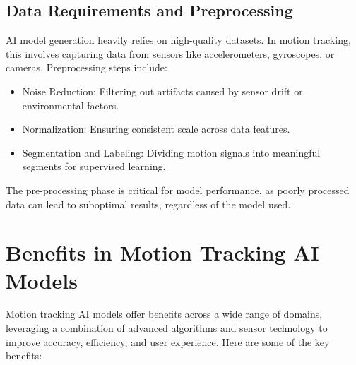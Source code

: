 \subsection{Data Requirements and Preprocessing}

AI model generation heavily relies on high-quality datasets. In motion tracking, this involves capturing data from sensors like accelerometers, gyroscopes, or cameras. Preprocessing steps include:

\begin{itemize}
    \item Noise Reduction: Filtering out artifacts caused by sensor drift or environmental factors.
    \item Normalization: Ensuring consistent scale across data features.
    \item Segmentation and Labeling: Dividing motion signals into meaningful segments for supervised learning.
\end{itemize}

The pre-processing phase is critical for model performance, as poorly processed data can lead to suboptimal results, regardless of the model used.

\section{Benefits in Motion Tracking AI Models}

Motion tracking AI models offer benefits across a wide range of domains, leveraging a combination of advanced algorithms and sensor technology to improve accuracy, efficiency, and user experience. Here are some of the key benefits:


